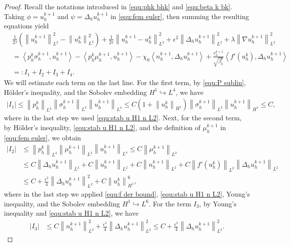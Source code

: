 \documentclass[11pt, reqno]{amsart}
\theoremstyle{definition}
\numberwithin{equation}{section}
\newcommand{\norm}[2]{\left\|{#1}\right\|_{#2}}
\newcommand{\inpro}[2]{\left\langle#1,#2\right\rangle}
\newcommand{\abs}[1]{\left|{#1}\right|}
\begin{document}
\begin{proof}
Recall the notations introduced in \eqref{equ:phk bhk} and \eqref{equ:beta k bk}.
Taking $\phi=u_h^{k+1}$ and $\psi=\Delta_h u_h^{k+1}$ in \eqref{equ:fem euler}, then summing the resulting equations yield
\begin{align}\label{equ:sum u I1 I4}
	&\frac{1}{2\tau} \left(\norm{u_h^{k+1}}{L^2}^2 - \norm{u_h^k}{L^2}^2 \right)
	+
	\frac{1}{2\tau} \norm{u_h^{k+1}-u_h^k}{L^2}^2
	+
	\epsilon^2 \norm{\Delta_h u_h^{k+1}}{L^2}^2
	+
	\lambda \norm{\nabla u_h^{k+1}}{L^2}^2
	\nonumber\\
	&=
	\inpro{p_h^k \sigma_h^{k+1}}{u_h^{k+1}}
	-
	\inpro{p_h^k \mu_h^{k+1}}{u_h^{k+1}}
	-
	\chi_0 \inpro{n_h^{k+1}}{\Delta_h u_h^{k+1}}
	+
	\frac{r_h^{k+1}}{\sqrt{\beta_h^k}} \inpro{f'(u_h^k)}{\Delta_h u_h^{k+1}}
	\nonumber\\
	&=:I_1+I_2+I_3+I_4.
\end{align}
We will estimate each term on the last line. For the first term, by \eqref{equ:P sublin}, H\"older's inequality, and the Sobolev embedding $H^1\hookrightarrow L^4$, we have
\begin{align*}
	\abs{I_1} \leq \norm{p_h^k}{L^4} \norm{\sigma_h^{k+1}}{L^2} \norm{u_h^{k+1}}{L^4}
	\leq
	C\left(1+ \norm{u_h^k}{H^1}\right) \norm{\sigma_h^{k+1}}{L^2} \norm{u_h^{k+1}}{H^1}
	\leq C,
\end{align*}
where in the last step we used \eqref{equ:stab u H1 n L2}. Next, for the second term, by H\"older's inequality, \eqref{equ:stab u H1 n L2}, and the definition of $\mu_h^{k+1}$ in \eqref{equ:fem euler}, we obtain
\begin{align*}
	\abs{I_2} 
	&\leq
	\norm{p_h^k}{L^4} \norm{\mu_h^{k+1}}{L^2} \norm{u_h^{k+1}}{L^4}
	\leq
	C\norm{\mu_h^{k+1}}{L^2}
	\\
	&\leq
	C\norm{\Delta_h u_h^{k+1}}{L^2}
	+
	C\norm{u_h^{k+1}}{L^2}
	+
	C\norm{n_h^{k+1}}{L^2}
	+
	C \norm{f'(u_h^k)}{L^2} \norm{\Delta_h u_h^{k+1}}{L^2}
	\\
	&\leq
	C + \frac{\epsilon^2}{4} \norm{\Delta_h u_h^{k+1}}{L^2}^2
	+
	C\norm{u_h^k}{H^1}^6,
\end{align*}
where in the last step we applied \eqref{equ:f der bound}, \eqref{equ:stab u H1 n L2}, Young's inequality, and the Sobolev embedding $H^1\hookrightarrow L^6$. For the term $I_3$, by Young's inequality and \eqref{equ:stab u H1 n L2}, we have
\begin{align*}
	\abs{I_3} 
	&\leq
	C\norm{n_h^{k+1}}{L^2}^2
	+
	\frac{\epsilon^2}{4} \norm{\Delta_h u_h^{k+1}}{L^2}^2
	\leq
	C+ \frac{\epsilon^2}{4} \norm{\Delta_h u_h^{k+1}}{L^2}^2.

\end{align*}
\end{proof}
\end{document}
